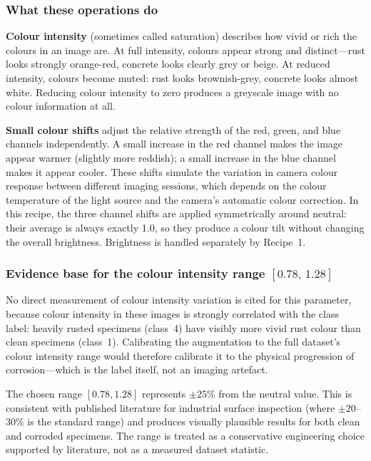 \documentclass[11pt,a4paper]{article}
\begin{document}
\subsubsection*{What these operations do}

\textbf{Colour intensity} (sometimes called saturation) describes how vivid or rich the colours in an image are. At full intensity, colours appear strong and distinct---rust looks strongly orange-red, concrete looks clearly grey or beige. At reduced intensity, colours become muted: rust looks brownish-grey, concrete looks almost white. Reducing colour intensity to zero produces a greyscale image with no colour information at all.

\textbf{Small colour shifts} adjust the relative strength of the red, green, and blue channels independently. A small increase in the red channel makes the image appear warmer (slightly more reddish); a small increase in the blue channel makes it appear cooler. These shifts simulate the variation in camera colour response between different imaging sessions, which depends on the colour temperature of the light source and the camera's automatic colour correction. In this recipe, the three channel shifts are applied symmetrically around neutral: their average is always exactly 1.0, so they produce a colour tilt without changing the overall brightness. Brightness is handled separately by Recipe~1.

\subsubsection*{Evidence base for the colour intensity range $[0.78,\,1.28]$}

No direct measurement of colour intensity variation is cited for this parameter, because colour intensity in these images is strongly correlated with the class label: heavily rusted specimens (class~4) have visibly more vivid rust colour than clean specimens (class~1). Calibrating the augmentation to the full dataset's colour intensity range would therefore calibrate it to the physical progression of corrosion---which is the label itself, not an imaging artefact.

The chosen range $[0.78, 1.28]$ represents $\pm25\%$ from the neutral value. This is consistent with published literature for industrial surface inspection (where $\pm20$--$30\%$ is the standard range) and produces visually plausible results for both clean and corroded specimens. The range is treated as a conservative engineering choice supported by literature, not as a measured dataset statistic.
\end{document}
